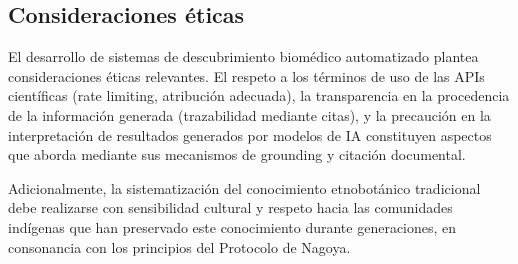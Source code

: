 \subsection{Consideraciones éticas}
\label{subsec:disc_ethics}

El desarrollo de sistemas de descubrimiento biomédico automatizado plantea consideraciones éticas relevantes. El respeto a los términos de uso de las APIs científicas (rate limiting, atribución adecuada), la transparencia en la procedencia de la información generada (trazabilidad mediante citas), y la precaución en la interpretación de resultados generados por modelos de IA constituyen aspectos que \sirca{} aborda mediante sus mecanismos de grounding y citación documental.

Adicionalmente, la sistematización del conocimiento etnobotánico tradicional debe realizarse con sensibilidad cultural y respeto hacia las comunidades indígenas que han preservado este conocimiento durante generaciones, en consonancia con los principios del Protocolo de Nagoya.
